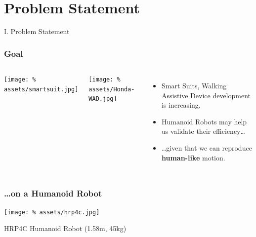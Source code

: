 \begin{frame}[plain]
  \titlepage
\end{frame}

\begin{frame}
  \tableofcontents
\end{frame}

\section{Problem Statement}
\begin{frame}
   \vfill
   \begin{center}
     \Large I. Problem Statement
   \end{center}
   \vfill
\end{frame}

\begin{frame}
  \frametitle{Goal}

  \begin{columns}
    \column{.25\paperwidth}
    \texttt{[image: \%
      assets/smartsuit.jpg]}
    \par
    \texttt{[image: \%
      assets/Honda-WAD.jpg]}
    \column{.70\paperwidth}
    \begin{itemize}
    \item Smart Suits, Walking Assistive Device development is
      increasing.
    \item Humanoid Robots may help us validate their efficiency\ldots
    \item \ldots given that we can reproduce \textbf{human-like}
      motion.
    \end{itemize}
  \end{columns}

\end{frame}

\begin{frame}
  \frametitle{\ldots on a Humanoid Robot}
  \begin{center}
    \texttt{[image: \%
      assets/hrp4c.jpg]}
    \par
    HRP4C Humanoid Robot (1.58m, 45kg)
  \end{center}

\end{frame}



